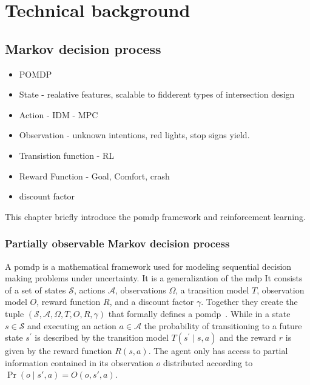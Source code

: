 \chapter{Technical background}\label{chapter:background}
%

\section{Markov decision process}\label{sec:mdp}

\begin{itemize}
    \item POMDP
    \item State - realative features, scalable to fidderent types of intersection design 
    \item Action - IDM - MPC
    \item Observation - unknown intentions, red lights, stop signs yield. 
    \item Transistion function - RL 
    \item Reward Function - Goal, Comfort, crash
    \item discount factor 
\end{itemize}



This chapter briefly introduce the \gls{pomdp} framework and reinforcement learning.  


\subsection{Partially observable Markov decision process}\label{section:pomdp}
A \gls{pomdp} is a mathematical framework used for modeling sequential decision making problems under uncertainty. 
It is a generalization of the \gls{mdp}
It consists of a set of states $\mathcal{S}$, actions $\mathcal{A}$, observations $\Omega$, a transition model $T$, observation model $O$, reward function $R$, and a discount factor $\gamma$. 
Together they create the tuple $(\mathcal{S},\mathcal{A},\Omega,T,O,R,\gamma)$ that formally defines a \gls{pomdp}~\cite{Kochenderfer2015}. 
While in a state $s \in \mathcal{S}$ and executing an action $a \in \mathcal{A}$ the probability of transitioning to a future state $s^\prime$ is described by the transition model $T(s^\prime \mid s,a)$ and the reward $r$ is given by the reward function $R(s,a)$. 
The agent only has access to partial information contained in its observation $o$ distributed according to $\Pr(o \mid s', a) = O(o, s', a)$.

